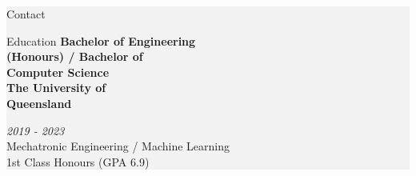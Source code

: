 \documentclass{custom-resume}
\begin{document}
\hspace{\leftmarginadjust}  %
\colorbox{f2f2f2}{
\begin{minipage}[t][23cm]{\leftouterwidth}


  \hspace{\leftoutermargin}  %
  \begin{minipage}[t][23cm]{\leftinnerwidth}

    \raggedright

    \vspace{6pt} %


    \begin{section}{Contact}
      \vspace{0.4em} %
    \end{section}


    \begin{section}{Education}
      {
        \small
        \textbf{Bachelor of Engineering\\ (Honours) / Bachelor of\\ Computer Science}
      } \\[8pt]

      {
        \large
        \textbf{The University of\\ Queensland} \\[8pt]
      }

      \textit{2019 - 2023} \\[8pt]

      Mechatronic Engineering / Machine Learning \\[8pt]

      1st Class Honours (GPA 6.9)

    \end{section}


\end{minipage}
\end{minipage}}
\end{document}
